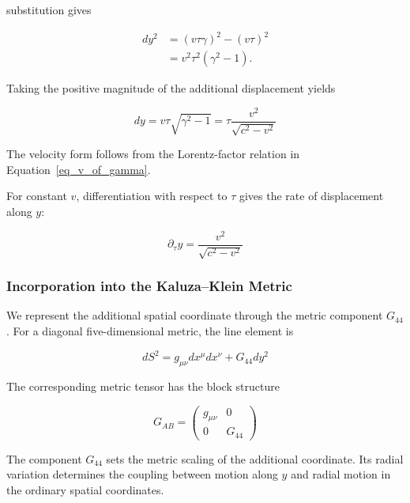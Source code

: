 \documentclass[pdflatex,sn-mathphys-num]{sn-jnl}%
\theoremstyle{thmstyleone}%
\theoremstyle{thmstyletwo}%
\theoremstyle{thmstylethree}%
\begin{document}
substitution gives

\begin{align}
    dy^2
    &= \left(v\tau\gamma\right)^2-\left(v\tau\right)^2\\
    &= v^2\tau^2\left(\gamma^2-1\right).
\end{align}

Taking the positive magnitude of the additional displacement yields

\begin{equation}
    dy = v\tau\sqrt{\gamma^2-1}
       = \tau\frac{v^2}{\sqrt{c^2-v^2}}
\end{equation}

The velocity form follows from the Lorentz-factor relation in Equation~\ref{eq_v_of_gamma}.

For constant $v$, differentiation with respect to $\tau$ gives the rate of displacement along $y$:

\begin{equation}
    \boxed{
        \partial_\tau y
        =
        \frac{v^2}{\sqrt{c^2-v^2}}
    }
    \label{eq_dy_dtau}
\end{equation}

\subsubsection{Incorporation into the Kaluza--Klein Metric}

We represent the additional spatial coordinate through the metric component $G_{44}$. For a diagonal five-dimensional metric, the line element is

\begin{equation}
    dS^2
    =
    g_{\mu\nu}dx^\mu dx^\nu
    +
    G_{44}dy^2
    \label{eq_kk_line_element}
\end{equation}

The corresponding metric tensor has the block structure

\begin{equation}
    \boxed{
    G_{AB}
    =
    \begin{pmatrix}
        g_{\mu\nu} & 0\\
        0 & G_{44}
    \end{pmatrix}
    }
    \label{eq_kk_metric}
\end{equation}

The component $G_{44}$ sets the metric scaling of the additional coordinate. Its radial variation determines the coupling between motion along $y$ and radial motion in the ordinary spatial coordinates.
\end{document}
